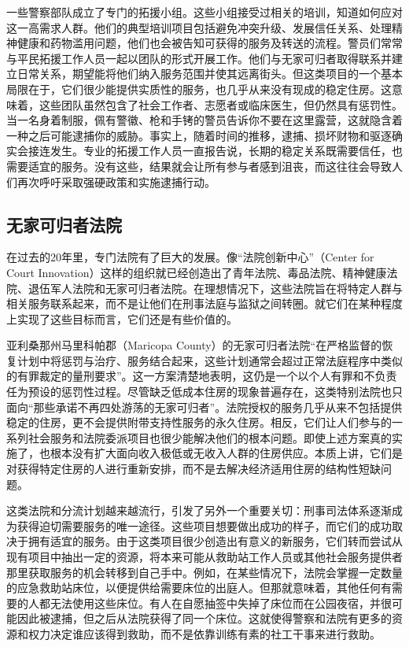 \documentclass[fontset=fandol, a4paper, 12pt, openright]{ctexbook}
\begin{document}
一些警察部队成立了专门的拓援小组。这些小组接受过相关的培训，知道如何应对这一高需求人群。他们的典型培训项目包括避免冲突升级、发展信任关系、处理精神健康和药物滥用问题，他们也会被告知可获得的服务及转送的流程。警员们常常与平民拓援工作人员一起以团队的形式开展工作。他们与无家可归者取得联系并建立日常关系，期望能将他们纳入服务范围并使其远离街头。但这类项目的一个基本局限在于，它们很少能提供实质性的服务，也几乎从来没有现成的稳定住房。这意味着，这些团队虽然包含了社会工作者、志愿者或临床医生，但仍然具有惩罚性。当一名身着制服，佩有警徽、枪和手铐的警员告诉你不要在这里露营，这就隐含着一种之后可能逮捕你的威胁。事实上，随着时间的推移，逮捕、损坏财物和驱逐确实会接连发生。专业的拓援工作人员一直报告说，长期的稳定关系既需要信任，也需要适宜的服务。没有这些，结果就会让所有参与者感到沮丧，而这往往会导致人们再次呼吁采取强硬政策和实施逮捕行动。

\subsection{无家可归者法院}
在过去的20年里，专门法院有了巨大的发展。像“法院创新中心”（Center for Court Innovation）这样的组织就已经创造出了青年法院、毒品法院、精神健康法院、退伍军人法院和无家可归者法院。在理想情况下，这些法院旨在将特定人群与相关服务联系起来，而不是让他们在刑事法庭与监狱之间转圈。就它们在某种程度上实现了这些目标而言，它们还是有些价值的。

亚利桑那州马里科帕郡（Maricopa County）的无家可归者法院“在严格监督的恢复计划中将惩罚与治疗、服务结合起来，这些计划通常会超过正常法庭程序中类似的有罪裁定的量刑要求”。这一方案清楚地表明，这仍是一个以个人有罪和不负责任为预设的惩罚性过程。尽管缺乏低成本住房的现象普遍存在，这类特别法院也只面向“那些承诺不再四处游荡的无家可归者”。法院授权的服务几乎从来不包括提供稳定的住房，更不会提供附带支持性服务的永久住房。相反，它们让人们参与的一系列社会服务和法院委派项目也很少能解决他们的根本问题。即使上述方案真的实施了，也根本没有扩大面向收入极低或无收入人群的住房供应。本质上讲，它们是对获得特定住房的人进行重新安排，而不是去解决经济适用住房的结构性短缺问题。

这类法院和分流计划越来越流行，引发了另外一个重要关切：刑事司法体系逐渐成为获得迫切需要服务的唯一途径。这些项目想要做出成功的样子，而它们的成功取决于拥有适宜的服务。由于这类项目很少创造出有意义的新服务，它们转而尝试从现有项目中抽出一定的资源，将本来可能从救助站工作人员或其他社会服务提供者那里获取服务的机会转移到自己手中。例如，在某些情况下，法院会掌握一定数量的应急救助站床位，以便提供给需要床位的出庭人。但那就意味着，其他任何有需要的人都无法使用这些床位。有人在自愿抽签中失掉了床位而在公园夜宿，并很可能因此被逮捕，但之后从法院获得了同一个床位。这就使得警察和法院有更多的资源和权力决定谁应该得到救助，而不是依靠训练有素的社工干事来进行救助。
\end{document}
